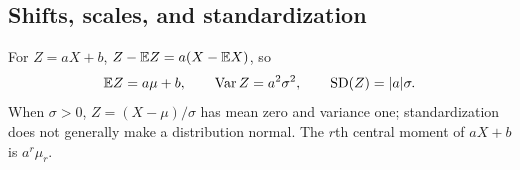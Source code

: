 \subsection{Shifts, scales, and standardization}
For $Z=aX+b$, $Z-\mathbb E Z=a(X-\mathbb E X)$, so
\[
\mathbb E Z=a\mu+b,\qquad\operatorname{Var} Z=a^2\sigma^2,\qquad\operatorname{SD}(Z)=|a|\sigma.
\]
When $\sigma>0$, $Z=(X-\mu)/\sigma$ has mean zero and variance one; standardization does not generally make a distribution normal. The $r$th central moment of $aX+b$ is $a^r\mu_r$.
